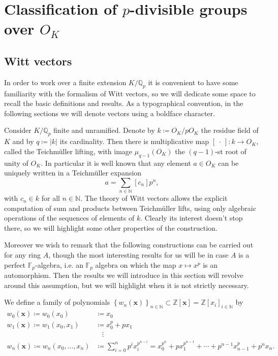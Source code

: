 \section{Classification of \texorpdfstring{$p$}{p}-divisible groups
	over \texorpdfstring{$O_{ K }$}{the ring of integers of K}}



\subsection{Witt vectors}
In order to work over a finite extension $K/\mathbb{Q}_p$ it is convenient to
have some familiarity with the formalism of Witt vectors, so we will dedicate some 
space to recall the basic definitions and results.
As a typographical convention, in the following sections we will
denote vectors using a boldface character.


\begin{rem}[Motivation]
	Consider $K/\mathbb{Q}_p$ finite and unramified.
	Denote by $k \coloneqq O_K/pO_K$ the residue field of $K$ and by $q \coloneqq \left| k \right|$
	its cardinality.
	Then there is multiplicative map $[\ \cdot \ ]\colon k \to O_K$,
	called the Teichmüller lifting, with image $\mu_{q-1}(O_K)$
	the $(q-1)$-st root of unity of $O_K$.
	In particular it is well known that any element $a \in O_K$
	can be uniquely written in a Teichmüller expansion
	\begin{equation*}
		a = \sum_{n \in \mathbb{N}} [c_n] p^n
	,\end{equation*}
	with $c_n \in k$ for all $n \in \mathbb{N}$.
	The theory of Witt vectors allows the explicit computation of sum and
	products between Teichmüller lifts, using only
	algebraic operations of the sequences of elements of $k$.
	Clearly its interest doesn't stop there, so we will highlight some 
	other properties of the construction.

	Moreover we wish to remark that the following constructions
	can be carried out for any ring $A$, though the most interesting
	results for us will be in case $A$ is a perfect $\mathbb{F}_p$-algebra,
	i.e. an $\mathbb{F}_p$ algebra on which the map $x \mapsto x^p$
	is an automorphism.
	Then the results we will introduce in this section will
	revolve around this assumption, but we will highlight when
	it is not strictly necessary.
\end{rem}


\begin{defn}%
	We define a family of polynomials $\left\{ w_n(\mathbf{x}) \right\}_{n \in \mathbb{N}} \subset
	\mathbb{Z}[\mathbf{x}] = \mathbb{Z}[x_i]_{i \in \mathbb{N}}$ by
	\begin{align*}
		w_0(\mathbf{x}) \coloneqq w_0(x_0) &\coloneqq x_0 \\
		w_1(\mathbf{x}) \coloneqq w_1(x_0, x_1) &\coloneqq x_0^p + px_1 \\
				&\ \ \ \ \! \vdots \\
		w_n(\mathbf{x}) \coloneqq w_n(x_0, \ldots, x_n) &\coloneqq
		\sum_{ i=0 }^{ n } p^i x_i^{p^{n-i}} =
		x_0^{p^n} + px_1^{p^{n-1}} + \cdots + p^{n-1}x_{n-1}^p + p^n x_n
	.\end{align*}
\end{defn}


